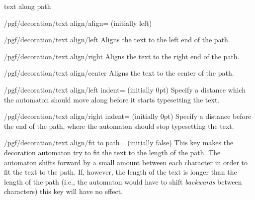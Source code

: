 \begin{decoration}{text along path}
\begin{key}{/pgf/decoration/text align/align= (initially left)}
\end{key}

\begin{stylekey}{/pgf/decoration/text align/left}
  Aligns the text to the left end of the path.

\end{stylekey}

\begin{stylekey}{/pgf/decoration/text align/right}
  Aligns the text to the right end of the path.
\end{stylekey}

\begin{stylekey}{/pgf/decoration/text align/center}
  Aligns the text to the center of the path.
\end{stylekey}

\begin{key}{/pgf/decoration/text align/left indent= (initially 0pt)}
  Specify a distance which the automaton should move along
  before it starts typesetting the text.
\end{key}

\begin{key}{/pgf/decoration/text align/right indent= (initially 0pt)}
  Specify a distance before the end of the path, where
  the automaton should stop typesetting the text.
\end{key}

\begin{key}{/pgf/decoration/text align/fit to path= (initially false)}
  This key makes the decoration automaton try to fit the text
  to the length of the path. The automaton shifts forward
  by a small amount between each character in order to fit the
  text to the path. If, however, the length of the text is longer
  than the length of the path (i.e., the automaton would have to
  shift \emph{backwards} between characters) this key will
  have no effect.

\begin{codeexample}[]
\end{codeexample}

\end{key}


\end{decoration}
